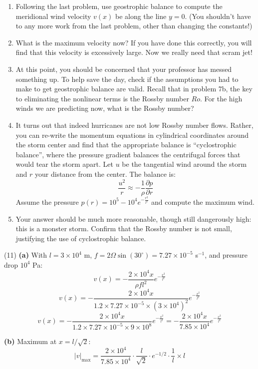 \documentclass[letterpaper, 11pt]{article}
\newcommand{\1}{\mathds{1}}	%
\theoremstyle{definition}
\begin{document}
\begin{enumerate}[resume]
\begin{enumerate}[label=(\alph*)]
\item Following the last problem, use geostrophic balance to compute the meridional wind velocity $v(x)$ be along the line $y = 0$. (You shouldn't have to any more work from the last problem, other than changing the constants!)
\item What is the maximum velocity now? If you have done this correctly, you will find that this velocity is excessively large. Now we really need that scram jet!
\item At this point, you should be concerned that your professor has messed something up. To help save the day, check if the assumptions you had to make to get geostrophic balance are valid. Recall that in problem 7b, the key to eliminating the nonlinear terms is the Rossby number $Ro$. For the high winds we are predicting now, what is the Rossby number?
\item It turns out that indeed hurricanes are not low Rossby number flows. Rather, you can re-write the momentum equations in cylindrical coordinates around the storm center and find that the appropriate balance is ``cyclostrophic balance'', where the pressure gradient balances the centrifugal forces that would tear the storm apart. Let $u$ be the tangential wind around the storm and $r$ your distance from the center. The balance is:
\[
\frac{u^2}{r} \approx -\frac{1}{\rho}\frac{\partial p}{\partial r}
\]
Assume the pressure $p(r) = 10^5 - 10^4 e^{-\frac{r^2}{l^2}}$ and compute the maximum wind.
\item Your answer should be much more reasonable, though still dangerously high: this is a monster storm. Confirm that the Rossby number is not small, justifying the use of cyclostrophic balance.
\end{enumerate}

(11)
\textbf{(a)} With $l = 3 \times 10^4$ m, $f = 2\Omega\sin(30^\circ) = 7.27 \times 10^{-5}$ s$^{-1}$, and pressure drop $10^4$ Pa:
\[
v(x) = -\frac{2 \times 10^4 x}{\rho f l^2} e^{-\frac{x^2}{l^2}}
\]
\[
v(x) = -\frac{2 \times 10^4 x}{1.2 \times 7.27 \times 10^{-5} \times (3 \times 10^4)^2} e^{-\frac{x^2}{l^2}}
\]
\[
v(x) = -\frac{2 \times 10^4 x}{1.2 \times 7.27 \times 10^{-5} \times 9 \times 10^8} e^{-\frac{x^2}{l^2}} = -\frac{2 \times 10^4 x}{7.85 \times 10^4} e^{-\frac{x^2}{l^2}}
\]

\textbf{(b)} Maximum at $x = l/\sqrt{2}$:
\[
|v|_{\max} = \frac{2 \times 10^4}{7.85 \times 10^4} \cdot \frac{l}{\sqrt{2}} \cdot e^{-1/2} \cdot \frac{1}{l} \times l
\]


\end{enumerate}
\end{document}
